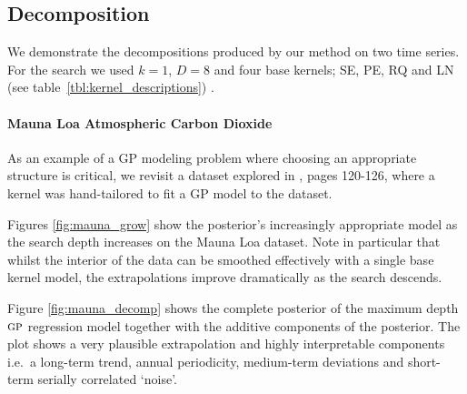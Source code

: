 \documentclass[twoside]{article}
\begin{document}
\subsection{Decomposition}

We demonstrate the decompositions produced by our method on two time series.
For the search we used $k = 1$, $D = 8$ and four base kernels; SE, PE, RQ and LN (see table~\ref{tbl:kernel_descriptions}) .



\paragraph{Mauna Loa Atmospheric Carbon Dioxide}

As an example of a GP modeling problem where choosing an appropriate structure is critical, we revisit a dataset explored in \cite{rasmussen38gaussian}, pages 120-126, where a kernel was hand-tailored to fit a GP model to the dataset.

Figures \ref{fig:mauna_grow} show the posterior's increasingly appropriate model as the search depth increases on the Mauna Loa dataset.
Note in particular that whilst the interior of the data can be smoothed effectively with a single base kernel model, the extrapolations improve dramatically as the search descends.

Figure \ref{fig:mauna_decomp} shows the complete posterior of the maximum depth ${\textsc{gp}}$ regression model together with the additive components of the posterior.
The plot shows a very plausible extrapolation and highly interpretable components i.e.~a long-term trend, annual periodicity, medium-term deviations and short-term serially correlated `noise'.
\end{document}
